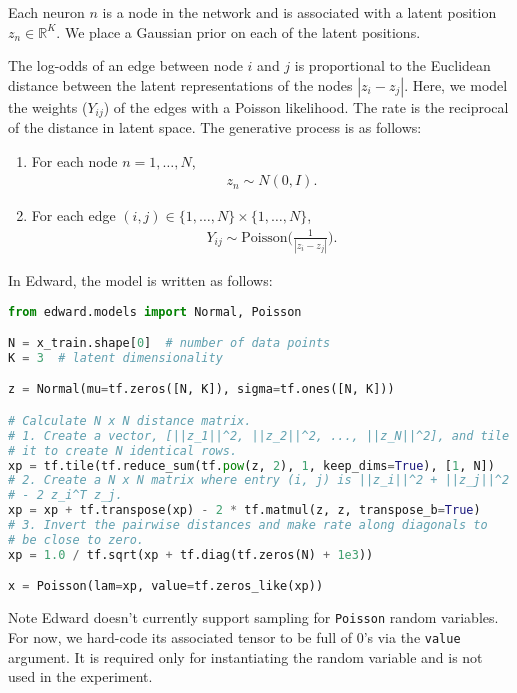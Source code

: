 Each neuron $n$ is a node in the network and is associated with a latent
position $z_n\in\mathbb{R}^K$.
We place a Gaussian prior on each of the latent positions.

The log-odds of an edge between node $i$ and
$j$ is proportional to the Euclidean distance between the latent
representations of the nodes $|z_i- z_j|$. Here, we
model the weights ($Y_{ij}$) of the edges with a Poisson likelihood.
The rate is the reciprocal of the distance in latent space. The
generative process is as follows:

\begin{enumerate}
\item
For each node $n=1,\ldots,N$,
\begin{align}
z_n \sim N(0,I).
\end{align}
\item
For each edge $(i,j)\in\{1,\ldots,N\}\times\{1,\ldots,N\}$,
\begin{align}
Y_{ij} \sim \text{Poisson}\Bigg(\frac{1}{|z_i - z_j|}\Bigg).
\end{align}
\end{enumerate}

In Edward, the model is written as follows:
\begin{lstlisting}[language=Python]
from edward.models import Normal, Poisson

N = x_train.shape[0]  # number of data points
K = 3  # latent dimensionality

z = Normal(mu=tf.zeros([N, K]), sigma=tf.ones([N, K]))

# Calculate N x N distance matrix.
# 1. Create a vector, [||z_1||^2, ||z_2||^2, ..., ||z_N||^2], and tile
# it to create N identical rows.
xp = tf.tile(tf.reduce_sum(tf.pow(z, 2), 1, keep_dims=True), [1, N])
# 2. Create a N x N matrix where entry (i, j) is ||z_i||^2 + ||z_j||^2
# - 2 z_i^T z_j.
xp = xp + tf.transpose(xp) - 2 * tf.matmul(z, z, transpose_b=True)
# 3. Invert the pairwise distances and make rate along diagonals to
# be close to zero.
xp = 1.0 / tf.sqrt(xp + tf.diag(tf.zeros(N) + 1e3))

x = Poisson(lam=xp, value=tf.zeros_like(xp))
\end{lstlisting}

Note Edward doesn't currently support sampling for \texttt{Poisson}
random variables. For now, we hard-code its associated tensor to be
full of 0's via the \texttt{value} argument. It is required only for
instantiating the random variable and is not used in the experiment.

